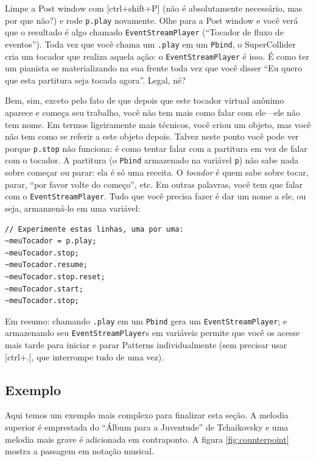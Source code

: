 Limpe a Post window com [ctrl+shift+P] (não é absolutamente necessário, mas por que não?) e rode \texttt{p.play} novamente. Olhe para a Post window e você verá que o resultado é algo chamado  \texttt{EventStreamPlayer} (“Tocador de fluxo de eventos”). Toda vez que você chama um \texttt{.play} em um \texttt{Pbind}, o SuperCollider cria um tocador que realiza aquela ação: o \texttt{EventStreamPlayer} é isso. É como ter um pianista se materializando na sua frente toda vez que você disser “Eu quero que esta partitura seja tocada agora”. Legal, né?


Bem, sim, exceto pelo fato de que depois que este tocador virtual anônimo aparece e começa seu trabalho, você não tem mais como falar com ele---ele não tem nome. Em termos ligeiramente mais técnicos, você criou um objeto, mas você não tem como se referir a este objeto depois. Talvez neste ponto você pode ver porque \texttt{p.stop} não funciona: é como tentar falar com a partitura em vez de falar com o tocador. A partitura (o \texttt{Pbind} armazenado na variável \texttt{p}) não sabe nada sobre começar ou parar: ela é só uma receita. O \emph{tocador} é quem sabe sobre tocar, parar, “por favor volte do começo”, etc. Em outras palavras, você tem que falar com o \texttt{EventStreamPlayer}. Tudo que você precisa fazer é dar um nome a ele, ou seja, armanzená-lo em uma variável:

 
\begin{lstlisting}[style=SuperCollider-IDE, basicstyle=\scttfamily\footnotesize]
// Experimente estas linhas, uma por uma:
~meuTocador = p.play;
~meuTocador.stop;
~meuTocador.resume;
~meuTocador.stop.reset;
~meuTocador.start;
~meuTocador.stop;
\end{lstlisting}
 

Em resumo: chamando \texttt{.play} em um \texttt{Pbind} gera um \texttt{EventStreamPlayer}; e armazenando seu \texttt{EventStreamPlayer}s em variáveis permite que você os acesse mais tarde para iniciar e parar Patterns individualmente (sem precisar usar [ctrl+.], que interrompe tudo de uma vez).

\subsection{Exemplo}

Aqui temos um exemplo mais complexo para finalizar esta seção. A melodia superior é emprestada do “Álbum para a Juventude” de Tchaikovsky e uma melodia mais grave é adicionada em contraponto. A figura \ref{fig:counterpoint} mostra a passagem em notação musical.
 
